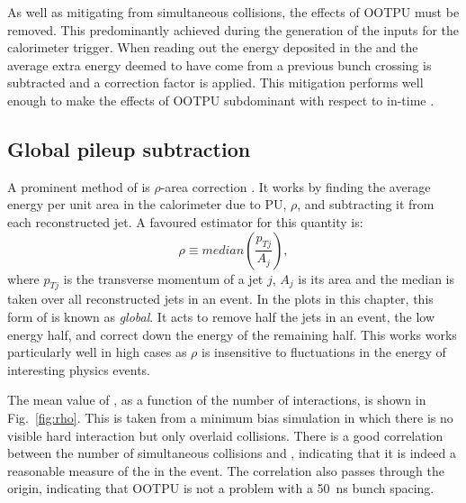 As well as mitigating \PU from simultaneous collisions, the effects of
\ac{OOTPU} must be removed. This predominantly achieved during the
generation of the \TT inputs for the calorimeter trigger. When reading
out the energy deposited in the \ECAL and \HCAL the average extra
energy deemed to have come from a previous bunch crossing is
subtracted and a correction factor is applied. This mitigation
performs well enough to make the effects of \ac{OOTPU} subdominant
with respect to in-time \PU.

\subsection{Global pileup subtraction}

A prominent method of \PUS is $\rho$-area correction
\cite{Cacciari:2007fd,Cacciari:2008gn}. It works by finding the
average energy per unit area in the calorimeter due to PU, $\rho$, and
subtracting it from each reconstructed jet. A favoured estimator for this
quantity is:
\begin{equation}
\rho\equiv median(\frac{p_{Tj}}{A_j}),
\end{equation}
where $p_{Tj}$ is the transverse momentum of a jet $j$, $A_j$ is its
area and the median is taken over all reconstructed jets in an event.
In the plots in this chapter, this form of \PUS is known as \emph{global}. It
acts to remove half the jets in an event, the low energy half, and
correct down the energy of the remaining half. This works works
particularly well in high \PU cases as $\rho$ is insensitive to
fluctuations in the energy of interesting physics events. 

The mean value of \rho, as a function of the number of interactions,
is shown in Fig.~\ref{fig:rho}. This is taken from a minimum bias \MC
simulation in which there is no visible hard interaction but only
overlaid \PU collisions. There is a good correlation between the
number of simultaneous collisions and \rho, indicating that it is
indeed a reasonable measure of the \PU in the event. The correlation
also passes through the origin, indicating that \ac{OOTPU} is not a
problem with a 50~ns bunch spacing.

